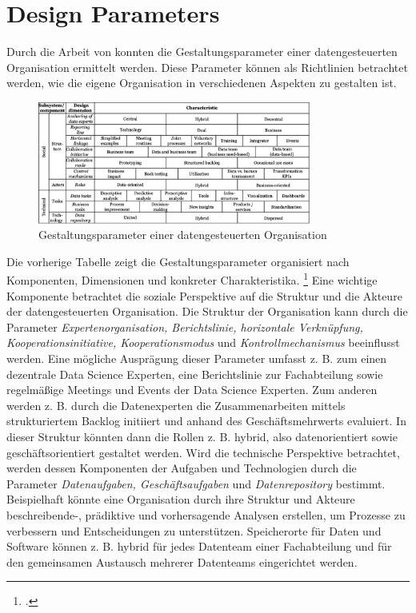 \section{Design Parameters}

Durch die Arbeit von  konnten die Gestaltungsparameter einer datengesteuerten Organisation ermittelt werden.
Diese Parameter können als Richtlinien betrachtet werden, wie die eigene Organisation in verschiedenen Aspekten zu gestalten ist.

\begin{figure}[htb]
    \centering
    \includegraphics[width=0.8\textwidth]{graphics/DDO_design.png}
    \caption{Gestaltungsparameter einer datengesteuerten Organisation}
    \label{fig:DDOs design}
\end{figure}

Die vorherige Tabelle zeigt die Gestaltungsparameter organisiert nach Komponenten, Dimensionen und konkreter Charakteristika. \footcite[Vgl.][S. 5]{JanineAdinaHagen.2020}
Eine wichtige Komponente betrachtet die soziale Perspektive auf die Struktur und die Akteure der datengesteuerten Organisation.
Die Struktur der Organisation kann durch die Parameter \textit{Expertenorganisation, Berichtslinie, horizontale Verknüpfung, Kooperationsinitiative, Kooperationsmodus} und \textit{Kontrollmechanismus} beeinflusst werden.
Eine mögliche Ausprägung dieser Parameter umfasst z. B. zum einen dezentrale Data Science Experten, eine Berichtslinie zur Fachabteilung sowie regelmäßige Meetings und Events der Data Science Experten.
Zum anderen werden z. B. durch die Datenexperten die Zusammenarbeiten mittels strukturiertem Backlog initiiert und anhand des Geschäftsmehrwerts evaluiert.
In dieser Struktur könnten dann die Rollen z. B. hybrid, also datenorientiert sowie geschäftsorientiert gestaltet werden.
Wird die technische Perspektive betrachtet, werden dessen Komponenten der Aufgaben und Technologien durch die Parameter \textit{Datenaufgaben, Geschäftsaufgaben} und \textit{Datenrepository} bestimmt.
Beispielhaft könnte eine Organisation durch ihre Struktur und Akteure beschreibende-, prädiktive und vorhersagende Analysen erstellen, um Prozesse zu verbessern und Entscheidungen zu unterstützen.
Speicherorte für Daten und Software können z. B. hybrid für jedes Datenteam einer Fachabteilung und für den gemeinsamen Austausch mehrerer Datenteams eingerichtet werden.

